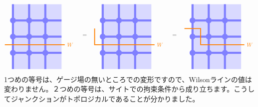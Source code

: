 \documentclass[report,paper=a4, fontsize=12pt, line_length=16cm, number_of_lines=33,dvipdfmx]{jlreq}
\numberwithin{equation}{chapter}
\begin{document}
\begin{align}
  \begin{tikzpicture}[baseline=0cm]
      \foreach \x in {0,1,2}{
          \foreach \y in {-2,-1,...,1}{
          \fill[plaqblue](\x,\y) rectangle (\x+1,\y+1);
          }
      }
      \foreach \x in {0,1,2}{
          \foreach \y in {-1,0,1}{
              \fill[linkblue] (\x,\y) circle (1.8mm);
          }
      }
      \foreach \x in {0,1,2}{
          \foreach \y in {-1,0,1}{
              \draw[linkblue, line width = 1.3mm](\x,\y)--(\x + 1,\y);
          }
      }
      \foreach \x in {0,1,2}{
          \foreach \y in {-2,-1,...,1}{
              \draw[linkblue, line width = 1.3mm](\x,\y)--(\x,\y + 1);
          }
      }
      \draw[red!50!yellow, ultra thick](-0.5,-0.5)--(3.2,-0.5) node[right]{$W$};
  \end{tikzpicture}
  \quad
  =\quad
  \begin{tikzpicture}[baseline=0cm]
      \foreach \x in {0,1,2}{
          \foreach \y in {-2,-1,...,1}{
          \fill[plaqblue](\x,\y) rectangle (\x+1,\y+1);
          }
      }
      \foreach \x in {0,1,2}{
          \foreach \y in {-1,0,1}{
              \fill[linkblue] (\x,\y) circle (1.8mm);
          }
      }
      \foreach \x in {0,1,2}{
          \foreach \y in {-1,0,1}{
              \draw[linkblue, line width = 1.3mm](\x,\y)--(\x + 1,\y);
          }
      }
      \foreach \x in {0,1,2}{
          \foreach \y in {-2,-1,...,1}{
              \draw[linkblue, line width = 1.3mm](\x,\y)--(\x,\y + 1);
          }
      }
      \draw[red!50!yellow, ultra thick](-0.5, 0.5)--(-0.5,-0.5)--(3.2,-0.5) node[right]{$W$};
  \end{tikzpicture}
  \quad
  =\quad
  \begin{tikzpicture}[baseline=0cm]
      \foreach \x in {0,1,2}{
          \foreach \y in {-2,-1,...,1}{
          \fill[plaqblue](\x,\y) rectangle (\x+1,\y+1);
          }
      }
      \foreach \x in {0,1,2}{
          \foreach \y in {-1,0,1}{
              \fill[linkblue] (\x,\y) circle (1.8mm);
          }
      }
      \foreach \x in {0,1,2}{
          \foreach \y in {-1,0,1}{
              \draw[linkblue, line width = 1.3mm](\x,\y)--(\x + 1,\y);
          }
      }
      \foreach \x in {0,1,2}{
          \foreach \y in {-2,-1,...,1}{
              \draw[linkblue, line width = 1.3mm](\x,\y)--(\x,\y + 1);
          }
      }
      \draw[red!50!yellow, ultra thick](-0.5, 0.5)--(0.5, 0.5)--(0.5,-0.5)--(3.2,-0.5) node[right]{$W$};
  \end{tikzpicture}
  \label{topologicaljunctionW}
\end{align}
1つめの等号は、ゲージ場の無いところでの変形ですので、Wilsonラインの値は変わりません。２つめの等号は、サイトでの拘束条件から成り立ちます。こうしてジャンクションがトポロジカルであることが分かりました。
\end{document}
